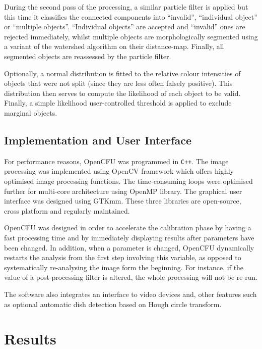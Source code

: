 \documentclass[10pt]{article}
\begin{document}
During the second pass of the processing, a similar particle filter is applied
but this time it classifies the connected components into ``invalid'',
``individual object'' or ``multiple objects''.
``Individual objects'' are accepted and ``invalid'' ones  are rejected
immediately, whilst multiple objects are morphologically segmented using a variant
of the watershed algorithm on their distance-map\cite{marotz_effective_2001}.
Finally, all segmented objects are reassessed by the particle filter.

Optionally, a normal distribution is fitted to the relative colour intensities of
objects that were not split (since they are less often falsely positive). This
distribution then serves to compute the likelihood of each object to be valid.
Finally, a simple likelihood user-controlled threshold is applied to exclude
marginal objects.



 \subsection*{Implementation and User Interface} For performance reasons, OpenCFU was
programmed in \texttt{C++}. The image processing was implemented using OpenCV framework\cite{opencv_library}
 which offers highly optimised image processing functions.
The time-consuming loops were optimised further for multi-core architecture using
OpenMP library\cite{openmp11}. The graphical user interface was designed using GTKmm.
These three libraries are open-source, cross platform and regularly maintained.

OpenCFU was designed in order to accelerate the calibration phase by having a
fast processing time and by immediately displaying results after parameters have
been changed. In addition, when a parameter is changed, OpenCFU dynamically restarts the analysis from
the first step involving this variable, as opposed to systematically re-analysing the image
form the beginning. For instance, if the value of a post-processing filter is altered, the whole processing will not be re-run.

The software also integrates an interface to video
devices and, other features such as optional
automatic dish detection based on Hough circle transform.


\section*{Results}
\end{document}
